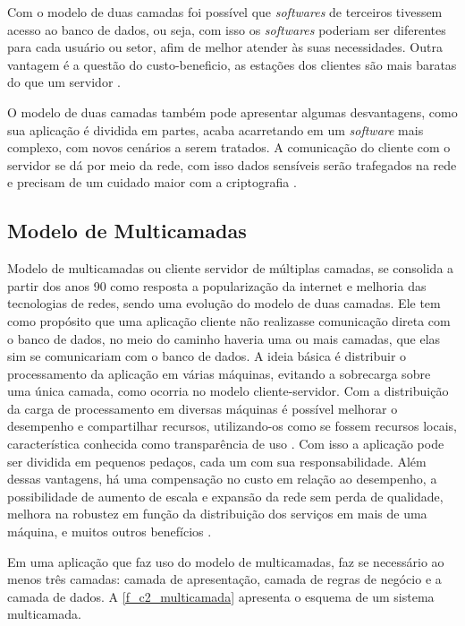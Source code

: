 Com o modelo de duas camadas foi possível que \textit{softwares} de terceiros tivessem acesso ao banco de dados, ou seja, com isso os \textit{softwares} poderiam ser diferentes para cada usuário ou setor, afim de melhor atender às suas necessidades. Outra vantagem é a questão do custo-beneficio, as estações dos clientes são mais baratas do que um servidor \cite{devmediaMultiCamadaP12018}.

O modelo de duas camadas também pode apresentar algumas desvantagens, como sua aplicação é dividida em partes, acaba acarretando em um \textit{software} mais complexo, com novos cenários a serem tratados. A comunicação do cliente com o servidor se dá por meio da rede, com isso dados sensíveis serão trafegados na rede e precisam de um cuidado maior com a criptografia \cite{rocha99}. 

\subsection{Modelo de Multicamadas}
Modelo de multicamadas ou cliente servidor de múltiplas camadas, se consolida a partir dos anos 90 como resposta a  popularização da internet e melhoria das tecnologias de redes, sendo  uma evolução do modelo de duas camadas. Ele tem como propósito  que uma aplicação cliente não realizasse comunicação direta com o banco de dados, no meio do caminho haveria uma ou mais camadas, que elas sim se comunicariam com o banco de dados. A ideia básica é distribuir o processamento da aplicação em várias máquinas, evitando a sobrecarga sobre uma única camada, como ocorria no modelo cliente-servidor. Com a distribuição da carga de processamento em diversas máquinas é possível melhorar o desempenho e compartilhar recursos, utilizando-os como se fossem recursos locais, característica conhecida como  transparência de uso \cite{devmediaMultiCamadaP12018}. Com isso a aplicação pode ser dividida em pequenos pedaços, cada um com sua responsabilidade. Além dessas vantagens, há uma compensação no custo em relação ao desempenho, a possibilidade de aumento de escala e expansão da rede sem perda de qualidade, melhora na robustez em função da distribuição dos serviços em mais de uma máquina, e muitos outros benefícios \cite{devmediaMultiCamadaP12018}.

Em uma aplicação que faz uso do  modelo de multicamadas, faz se necessário ao menos três camadas: camada de apresentação, camada de regras de negócio e a camada de dados. A \autoref{f_c2_multicamada} apresenta o esquema de um sistema multicamada. 


